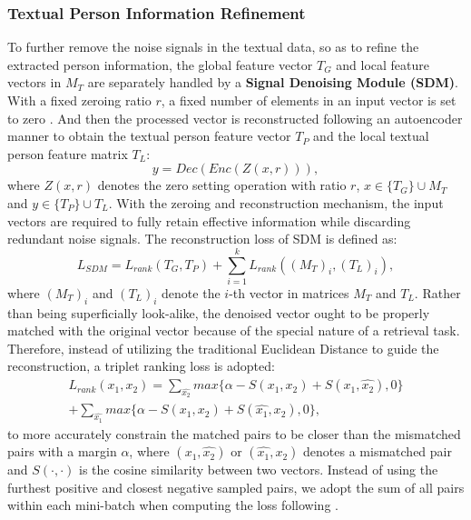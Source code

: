 \documentclass[sigconf]{acmart}
\begin{document}
\subsubsection{Textual Person Information Refinement}
To further remove the noise signals in the textual data, so as to refine the extracted person information, the global feature vector $T_{G}$ and local feature vectors in $M_{T}$ are separately handled by a \textbf{Signal Denoising Module (SDM)}. With a fixed zeroing ratio $r$, a fixed number of elements in an input vector is set to zero \cite{vincent2008denoisingAE}. And then the processed vector is reconstructed following an autoencoder manner to obtain the textual person feature vector $T_{P}$ and the local textual person feature matrix $T_{L}$:
\begin{equation}
	y = Dec(Enc(Z(x, r))),
\end{equation}
where $Z(x, r)$ denotes the zero setting operation with ratio $r$, $x \in \{T_{G}\} \cup M_{T}$ and $y \in \{T_{P}\} \cup T_{L}$. With the zeroing and reconstruction mechanism, the input vectors are required to fully retain effective information while discarding redundant noise signals. The reconstruction loss of SDM is defined as:
\begin{equation}
	L_{SDM} = L_{rank}(T_G, T_P) + \sum_{i=1}^{k} L_{rank}((M_{T})_{i}, (T_{L})_{i}),
\end{equation}
where $(M_{T})_{i}$ and $(T_{L})_{i}$ denote the $i$-th vector in matrices $M_{T}$ and $T_{L}$. Rather than being superficially look-alike, the denoised vector ought to be properly matched with the original vector because of the special nature of a retrieval task. Therefore, instead of utilizing the traditional Euclidean Distance to guide the reconstruction, a triplet ranking loss is adopted:
\begin{multline}
	L_{rank}(x_1, x_2) = \sum_{\widehat{x_2}} max\{\alpha - S(x_1, x_2) + S(x_1, \widehat{x_2}), 0\}\\
	+ \sum_{\widehat{x_1}} max\{\alpha - S(x_1, x_2) + S(\widehat{x_1}, x_2), 0\},
\end{multline}
to more accurately constrain the matched pairs to be closer than the mismatched pairs with a margin $\alpha$, where $(x_1, \widehat{x_2})$ or $(\widehat{x_1}, x_2)$ denotes a mismatched pair and $S(\cdot, \cdot)$ is the cosine similarity between two vectors. Instead of using the furthest positive and closest negative sampled pairs, we adopt the sum of all pairs within each mini-batch when computing the loss following \cite{faghri2017vse++}.
\end{document}
